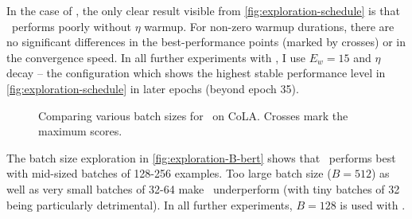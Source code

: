 {{    In the case of \BERTS, the only clear result visible from \autoref{fig:exploration-schedule} is that \BERTS~performs poorly without $\eta$ warmup. For non-zero warmup durations, there are no significant differences in the best-performance points (marked by crosses) or in the convergence speed. In all further experiments with \BERTS, I use $E_w=15$ and $\eta$ decay -- the configuration which shows the highest stable performance level in \autoref{fig:exploration-schedule} in later epochs (beyond epoch 35).

    \begin{figure}[h!t]
      \centering
      \caption{Comparing various batch sizes for \BERTS~on CoLA. Crosses mark the maximum scores. \sliding}
      \label{fig:exploration-B-bert}
    \end{figure}

    The batch size exploration in \autoref{fig:exploration-B-bert} shows that \BERTS~performs best with mid-sized batches of 128-256 examples. Too large batch size ($B=512$) as well as very small batches of 32-64 make \BERTS~underperform (with tiny batches of 32 being particularly detrimental).
    In all further experiments, $B=128$ is used with \BERTS.
  }
}

